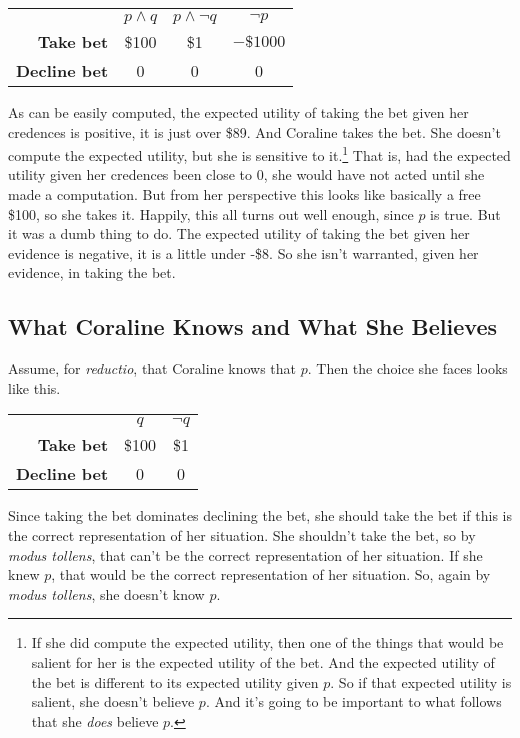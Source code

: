\begin{center}
\begin{tabular}{r c c c}
 & \textbf{$p \wedge q$} & \textbf{$p \wedge \neg q$} & \textbf{$\neg p$} \\
\textbf{Take bet} & \$100 & \$1 & $-\$1000$ \\
\textbf{Decline bet} & 0 & 0 & 0 \\
\end{tabular}
\end{center}

\noindent As can be easily computed, the expected utility of taking the bet given her credences is positive, it is just over \$89. And Coraline takes the bet. She doesn't compute the expected utility, but she is sensitive to it.\footnote{If she did compute the expected utility, then one of the things that would be salient for her is the expected utility of the bet. And the expected utility of the bet is different to its expected utility given $p$. So if that expected utility is salient, she doesn't believe $p$. And it's going to be important to what follows that she \textit{does} believe $p$.} That is, had the expected utility given her credences been close to 0, she would have not acted until she made a computation. But from her perspective this looks like basically a free \$100, so she takes it. Happily, this all turns out well enough, since $p$ is true. But it was a dumb thing to do. The expected utility of taking the bet given her evidence is negative, it is a little under -\$8. So she isn't warranted, given her evidence, in taking the bet.

\subsection{What Coraline Knows and What She Believes}

Assume, for \textit{reductio}, that Coraline knows that $p$. Then the choice she faces looks like this.

\begin{center}
\begin{tabular}{r c c}
 & \textbf{$q$} & \textbf{$\neg q$}  \\
\textbf{Take bet} & \$100 & \$1 \\
\textbf{Decline bet} & 0 & 0\\
\end{tabular}
\end{center}

\noindent Since taking the bet dominates declining the bet, she should take the bet if this is the correct representation of her situation. She shouldn't take the bet, so by \textit{modus tollens}, that can't be the correct representation of her situation. If she knew $p$, that would be the correct representation of her situation. So, again by \textit{modus tollens}, she doesn't know $p$.

